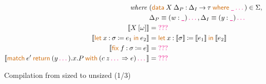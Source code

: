 \documentclass{article}
\newcommand{\meta}[1]{\mathsf{\textcolor{metacolour}{#1}}}
\newcommand{\kw}[1]{\mathsf{\textcolor{kwcolour}{#1}}}
\newcommand{\kwopen}[1]{\kw{#1}\:}
\newcommand{\kwbin}[1]{\:\kw{#1}\:}
\newcommand{\arr}[2]{#1 \mathbin{\rightarrow} #2}
\newcommand{\app}[2]{#1 \: #2}
\newcommand{\App}[2]{#1 \: \mathopen{[} #2 \mathclose{]}}
\newcommand{\letin}[4]{\kwopen{let} \mathopen{} #1 \mathbin{:} #2 \mathbin{\coloneqq} #3 \kwbin{in} #4}
\newcommand{\match}[3]{\kwopen{match} #1 \kwbin{return} #2 \kwbin{with} #3}
\newcommand{\fix}[3]{\kwopen{fix} #1 \mathbin{:} #2 \mathbin{\coloneqq} #3}
\newcommand{\data}[3]{\kwopen{data} #1 \mathbin{:} #2 \kwbin{where} #3}
\newcommand{\annot}[2]{#1 \mathbin{:} #2}
\newcommand{\seq}{\,\meta{\dots}\,}
\newcommand{\any}{\meta{\texttt{\_}}}
\newcommand{\compile}[1]{\mathopen{\llbracket} #1 \mathclose{\rrbracket}}
\newcommand{\huh}{\meta{???}}
\begin{document}
\begin{figure}[h]
\begin{align*}
        \textit{where} ~ &(\data{\app{X}{\Delta_P}}{\arr{\Delta_I}{\tau}}{\any \seq}) \in \Sigma, \\
        &\Delta_P \equiv (\annot{w}{\any}) \seq, \Delta_I \equiv (\annot{y}{\any}) \seq \\
        \compile{\App{X}{\omega}} &= \huh \\
        \compile{\letin{x}{\sigma}{e_1}{e_2}} &= \letin{x}{\compile{\sigma}}{\compile{e_1}}{\compile{e_2}} \\
        \compile{\fix{f}{\sigma}{e}} &= \huh \\
        \compile{\match{e'}{(y \seq).x.P}{(\app{c}{z \seq} \Rightarrow e) \seq}} &= \huh
    \end{align*}
    \caption{Compilation from sized to unsized (1/3)}
    \label{fig:compilation-untyped}
\end{figure}
\fi
\end{document}

